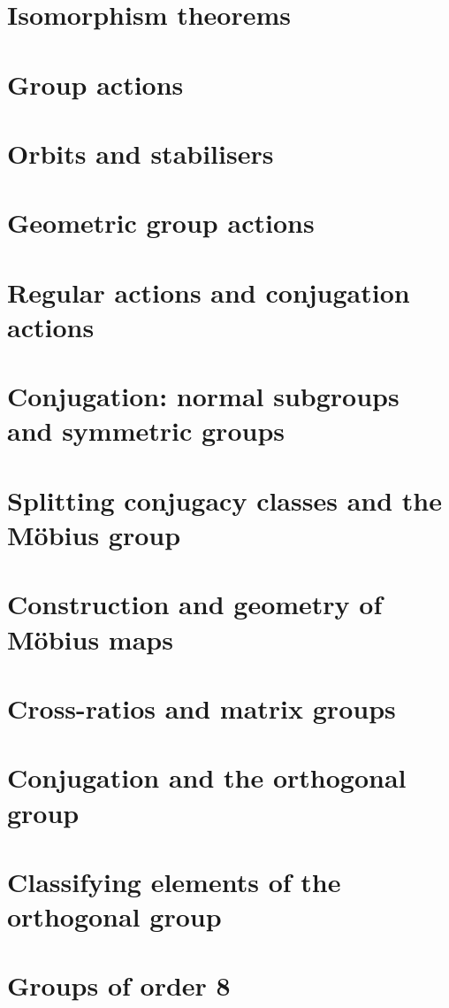 \documentclass{article}
\begin{document}
\section{Isomorphism theorems}

\section{Group actions}

\section{Orbits and stabilisers}

\section{Geometric group actions}

\section{Regular actions and conjugation actions}

\section{Conjugation: normal subgroups and symmetric groups}

\section{Splitting conjugacy classes and the M\"obius group}

\section{Construction and geometry of M\"obius maps}

\section{Cross-ratios and matrix groups}

\section{Conjugation and the orthogonal group}

\section{Classifying elements of the orthogonal group}

\section{Groups of order 8}

\end{document}
